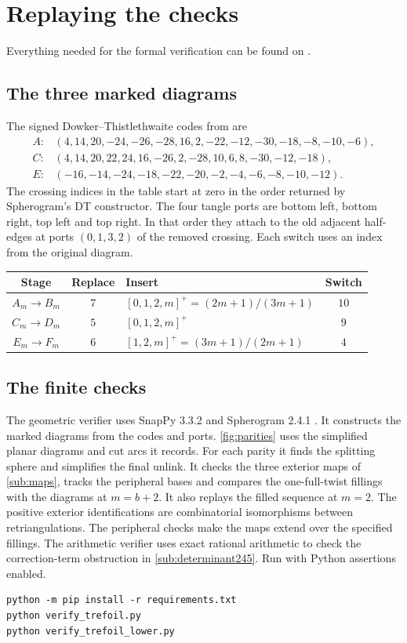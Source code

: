 \documentclass[a4paper,11pt]{amsart}
\numberwithin{equation}{subsection}
\theoremstyle{plain}
\theoremstyle{remark}
\begin{document}
\section{Replaying the checks}\label{sec:verification}

Everything needed for the formal verification can be found on \cite{DKT2}.

\subsection{The three marked diagrams}

The signed Dowker--Thistlethwaite codes from \cite[Theorem~1.3]{BH-small} are
\begin{align*}
A\colon{}&(4,14,20,-24,-26,-28,16,2,-22,-12,-30,-18,-8,-10,-6),\\
C\colon{}&(4,14,20,22,24,16,-26,2,-28,10,6,8,-30,-12,-18),\\
E\colon{}&(-16,-14,-24,-18,-22,-20,-2,-4,-6,-8,-10,-12).
\end{align*}
The crossing indices in the table start at zero in the order returned by Spherogram's DT constructor. The four tangle ports are bottom left, bottom right, top left and top right. In that order they attach to the old adjacent half-edges at ports $(0,1,3,2)$ of the removed crossing. Each switch uses an index from the original diagram.
\begin{center}
\begin{tabular}{@{}c c l c@{}}
\toprule
Stage & Replace & Insert & Switch\\
\midrule
$A_m\to B_m$ & $7$ & $[0,1,2,m]^+=(2m+1)/(3m+1)$ & $10$\\
$C_m\to D_m$ & $5$ & $[0,1,2,m]^+$ & $9$\\
$E_m\to F_m$ & $6$ & $[1,2,m]^+=(3m+1)/(2m+1)$ & $4$\\
\bottomrule
\end{tabular}
\end{center}

\subsection{The finite checks}

The geometric verifier uses SnapPy 3.3.2 and Spherogram 2.4.1 \cite{SnapPy}. It constructs the marked diagrams from the codes and ports. \autoref{fig:parities} uses the simplified planar diagrams and cut arcs it records. For each parity it finds the splitting sphere and simplifies the final unlink. It checks the three exterior maps of \autoref{sub:maps}, tracks the peripheral bases and compares the one-full-twist fillings with the diagrams at $m=b+2$. It also replays the filled sequence at $m=2$. The positive exterior identifications are combinatorial isomorphisms between retriangulations. The peripheral checks make the maps extend over the specified fillings. The arithmetic verifier uses exact rational arithmetic to check the correction-term obstruction in \autoref{sub:determinant245}. Run with Python assertions enabled.
\begin{verbatim}
python -m pip install -r requirements.txt
python verify_trefoil.py
python verify_trefoil_lower.py
\end{verbatim}
\end{document}
